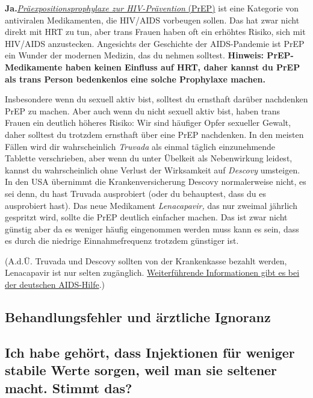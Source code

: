 \documentclass{article}
\begin{document}
\textbf{Ja.}\href{https://de.wikipedia.org/wiki/Pr%C3%A4expositionsprophylaxe}{\textit{Präexpositionsprophylaxe zur HIV-Prävention} (PrEP)} ist eine Kategorie von antiviralen Medikamenten, die HIV/AIDS vorbeugen sollen. Das hat zwar nicht direkt mit HRT zu tun, aber trans Frauen haben oft ein erhöhtes Risiko, sich mit HIV/AIDS anzustecken. Angesichts der Geschichte der AIDS-Pandemie ist PrEP ein Wunder der modernen Medizin, das du nehmen solltest. \textbf{Hinweis: PrEP-Medikamente haben keinen Einfluss auf HRT, daher kannst du PrEP als trans Person bedenkenlos eine solche Prophylaxe machen.}

Insbesondere wenn du sexuell aktiv bist, solltest du ernsthaft darüber nachdenken PrEP zu machen. Aber auch wenn du nicht sexuell aktiv bist, haben trans Frauen ein deutlich höheres Risiko: Wir sind häufiger Opfer sexueller Gewalt, daher solltest du trotzdem ernsthaft über eine PrEP nachdenken. In den meisten Fällen wird dir wahrscheinlich \textit{Truvada} als einmal täglich einzunehmende Tablette verschrieben, aber wenn du unter Übelkeit als Nebenwirkung leidest, kannst du wahrscheinlich ohne Verlust der Wirksamkeit auf \textit{Descovy} umsteigen. In den USA übernimmt die Krankenversicherung Descovy normalerweise nicht, es sei denn, du hast Truvada ausprobiert (oder du behauptest, dass du es ausprobiert hast). Das neue Medikament \textit{Lenacapavir,} das nur zweimal jährlich gespritzt wird, sollte die PrEP deutlich einfacher machen. Das ist zwar nicht günstig aber da es weniger häufig eingenommen werden muss kann es sein, dass es durch die niedrige Einnahmefrequenz trotzdem günstiger ist.

(A.d.Ü. Truvada und Descovy sollten von der Krankenkasse bezahlt werden, Lenacapavir ist nur selten zugänglich. \href{https://www.aidshilfe.de/de/hiv-prep/prep-praxen-finden-kosten}{Weiterführende Informationen gibt es bei der deutschen AIDS-Hilfe}.)

\subsection*{Behandlungsfehler und ärztliche Ignoranz}

\subsection{Ich habe gehört, dass Injektionen für weniger stabile Werte sorgen, weil man sie seltener macht. Stimmt das?}
																  
\end{document}
